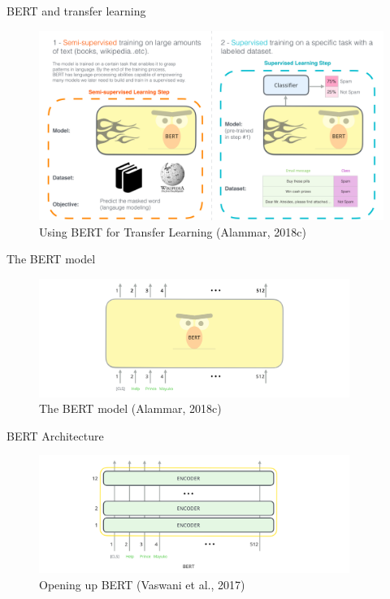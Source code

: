 \documentclass[10pt]{beamer}
\begin{document}
\begin{frame}{BERT and transfer learning}

\begin{figure}[h]
\centering
\includegraphics[width=1\textwidth]{fig/bert-transfer-learning.png}
\caption{Using BERT for Transfer Learning (Alammar, 2018c)}
\end{figure}

\end{frame}


\begin{frame}{The BERT model}

\begin{figure}[h]
\centering
\includegraphics[width=0.9\textwidth]{fig/bert-input-output.png}
\caption{The BERT model (Alammar, 2018c)}
\end{figure}

\end{frame}


\begin{frame}{BERT Architecture}

\begin{figure}[h]
\centering
\includegraphics[width=0.9\textwidth]{fig/bert-encoders-input.png}
\caption{Opening up BERT (Vaswani et al., 2017)}
\end{figure}

\end{frame}
\end{document}
